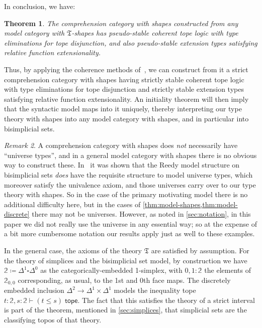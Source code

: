 \documentclass[12pt]{amsart}
\theoremstyle{plain}
\newtheorem{thm}{Theorem}[section]
\theoremstyle{definition}
\theoremstyle{remark}
\newtheorem{rmk}[thm]{Remark}
\numberwithin{equation}{section}
\newcommand{\defeq}{\coloneqq}
\newcommand{\types}{\vdash}
\newcommand{\tope}{\;\mathsf{tope}}
\newcommand{\two}{\mathbb{2}}
\newcommand{\fT}{\mathfrak{T}}
\begin{document}
In conclusion, we have:

\begin{thm}
  The comprehension category with shapes constructed from any model category with $\fT$-shapes has pseudo-stable coherent tope logic with type eliminations for tope disjunction, and also pseudo-stable extension types satisfying relative function extensionality.
\end{thm}

Thus, by applying the coherence methods of~\cite{LW}, we can construct from it a strict comprehension category with shapes having strictly stable coherent tope logic with type eliminations for tope disjunction and strictly stable extension types satisfying relative function extensionality.
An initiality theorem will then imply that the syntactic model maps into it uniquely, thereby interpreting our type theory with shapes into any model category with shapes, and in particular into bisimplicial sets.

\begin{rmk}
  A comprehension category with shapes does \emph{not} necessarily have ``universe types'', and in a general model category with shapes there is no obvious way to construct these.
  In~\cite{elreedy} it was shown that the Reedy model structure on bisimplicial sets \emph{does} have the requisite structure to model universe types, which moreover satisfy the univalence axiom, and those universes carry over to our type theory with shapes.
  So in the case of the primary motivating model there is no additional difficulty here, but in the cases of \cref{thm:model-shapes,thm:model-discrete} there may not be universes.
  However, as noted in \cref{sec:notation}, in this paper we did not really use the universe in any essential way; so at the expense of a bit more cumbersome notation our results apply just as well to these examples.
\end{rmk}

In the general case, the axioms of the theory $\fT$ are satisfied by assumption.
For the theory of simplices and the bisimplicial set model, by construction we have $\two \defeq \Delta^1 \square \Delta^0$ as the categorically-embedded 1-simplex, with $0,1 : \two$ the elements of $\two_{0,0}$ corresponding, as usual, to the 1st and 0th face maps.
The discretely embedded inclusion $\Delta^2 \to \Delta^1\times \Delta^1$ models the inequality tope $t :\two,s:\two \types (t \leq s) \tope$.
The fact that this satisfies the theory of a strict interval is part of the theorem, mentioned in \cref{sec:simplices}, that simplicial sets are the classifying topos of that theory.
\end{document}
